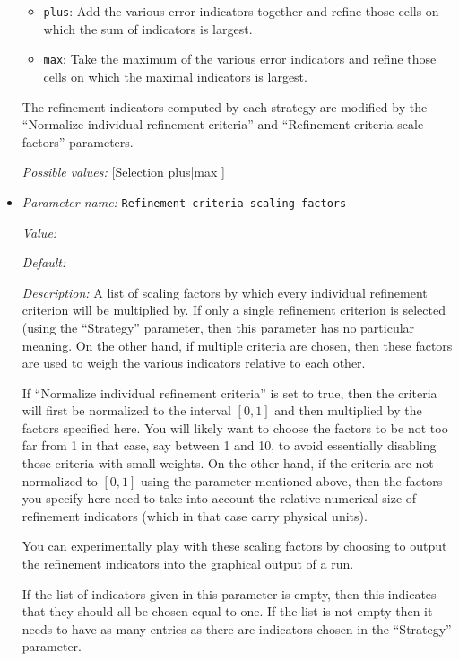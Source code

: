 \begin{itemize}
\begin{itemize}
\item \texttt{plus}: Add the various error indicators together and refine those cells on which the sum of indicators is largest.
\item \texttt{max}: Take the maximum of the various error indicators and refine those cells on which the maximal indicators is largest.
\end{itemize}The refinement indicators computed by each strategy are modified by the ``Normalize individual refinement criteria'' and ``Refinement criteria scale factors'' parameters.


{\it Possible values:} [Selection plus|max ]
\item {\it Parameter name:} {\tt Refinement criteria scaling factors}


{\it Value:} 


{\it Default:} 


{\it Description:} A list of scaling factors by which every individual refinement criterion will be multiplied by. If only a single refinement criterion is selected (using the ``Strategy'' parameter, then this parameter has no particular meaning. On the other hand, if multiple criteria are chosen, then these factors are used to weigh the various indicators relative to each other. 

If ``Normalize individual refinement criteria'' is set to true, then the criteria will first be normalized to the interval $[0,1]$ and then multiplied by the factors specified here. You will likely want to choose the factors to be not too far from 1 in that case, say between 1 and 10, to avoid essentially disabling those criteria with small weights. On the other hand, if the criteria are not normalized to $[0,1]$ using the parameter mentioned above, then the factors you specify here need to take into account the relative numerical size of refinement indicators (which in that case carry physical units).

You can experimentally play with these scaling factors by choosing to output the refinement indicators into the graphical output of a run.

If the list of indicators given in this parameter is empty, then this indicates that they should all be chosen equal to one. If the list is not empty then it needs to have as many entries as there are indicators chosen in the ``Strategy'' parameter.



\end{itemize}

